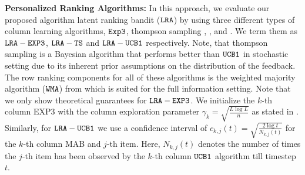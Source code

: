 \textbf{Personalized Ranking Algorithms:} In this approach, we evaluate our proposed algorithm latent ranking bandit (${\tt LRA}$) by using three different types of column learning algorithms, ${\tt Exp3}$, thompson sampling  \citep{thompson1933likelihood}, \citep{thompson1935theory}, \citep{agrawal2012analysis} and \ucb. We term them as ${\tt LRA-EXP3}$, ${\tt LRA-TS}$ and ${\tt LRA-UCB1}$ respectively. Note, that thompson sampling is a Bayesian algorithm that performs better than ${\tt UCB1}$ in stochastic setting due to its inherent prior assumptions on the distribution of the feedback. The row ranking components for all of these algorithms is the weighted majority algorithm (${\tt WMA}$) from \citet{littlestone1994weighted} which is suited for the full information setting. Note that we only show theoretical guarantees for ${\tt LRA-EXP3}$. We initialize the $k$-th column EXP3 with the column exploration parameter $\gamma_k = \sqrt{\frac{L \log L}{n}}$ as stated in \citet{auer2002nonstochastic}. Similarly, for ${\tt LRA-UCB1}$ we use  a confidence interval of $c_{k, j}(t) = \sqrt{\frac{2\log t}{N_{k,j}(t)}}$  for the $k$-th column MAB and $j$-th item. Here, $N_{k, j}(t)$ denotes the number of times the $j$-th item has been observed by the $k$-th column ${\tt UCB1}$ algorithm till timestep $t$.



%


